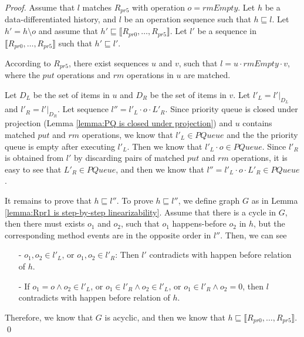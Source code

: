 \documentclass{llncs}
\begin{document}
\begin {proof}

Assume that $l$ matches $R_{\textit{pr5}}$ with operation $o=\textit{rmEmpty}$. Let $h$ be a data-differentiated history, and $l$ be an operation sequence such that $h \sqsubseteq l$. Let $h'=h \setminus o$ and assume that $h' \sqsubseteq \llbracket R_{\textit{pr0}},\ldots,R_{\textit{pr5}} \rrbracket$. Let $l'$ be a sequence in $\llbracket R_{\textit{pr0}},\ldots,R_{\textit{pr5}} \rrbracket$ such that $h' \sqsubseteq l'$.




According to $R_{\textit{pr5}}$, there exist sequences $u$ and $v$, such that $l=u \cdot \textit{rmEmpty} \cdot v$, where the $\textit{put}$ operations and $\textit{rm}$ operations in $u$ are matched.

Let $D_L$ be the set of items in $u$ and $D_R$ be the set of items in $v$. Let $l'_L = l' \vert_{D_L}$ and $l'_R = l' \vert_{D_R}$. Let sequence $l'' = l'_L \cdot o \cdot L'_R$. Since priority queue is closed under projection (Lemma \ref{lemma:PQ is closed under projection}) and $u$ contains matched $\textit{put}$ and $\textit{rm}$ operations, we know that $l'_L \in \textit{PQueue}$ and the the priority queue is empty after executing $l'_L$. Then we know that $l'_L \cdot o \in \textit{PQueue}$. Since $l'_R$ is obtained from $l'$ by discarding pairs of matched $\textit{put}$ and $\textit{rm}$ operations, it is easy to see that $L'_R \in \textit{PQueue}$, and then we know that $l'' = l'_L \cdot o \cdot L'_R \in \textit{PQueue}$.

It remains to prove that $h \sqsubseteq l''$. To prove $h \sqsubseteq l''$, we define graph $G$ as in Lemma \ref{lemma:Rpr1 is step-by-step linearizability}. Assume that there is a cycle in $G$, then there must exists $o_1$ and $o_2$, such that $o_1$ happens-before $o_2$ in $h$, but the corresponding method events are in the opposite order in $l''$. Then, we can see

\begin{itemize}
\setlength{\itemsep}{0.5pt}
\item[-] $o_1,o_2 \in l'_L$, or $o_1,o_2 \in l'_R$: Then $l'$ contradicts with happen before relation of $h$.

\item[-] If $o_1=o \wedge o_2 \in l'_L$, or $o_1 \in l'_R \wedge o_2 \in l'_L$, or $o_1 \in l'_R \wedge o_2 = 0$, then $l$ contradicts with happen before relation of $h$.
\end{itemize}

Therefore, we know that $G$ is acyclic, and then we know that $h \sqsubseteq \llbracket R_{\textit{pr0}},\ldots,R_{\textit{pr5}} \rrbracket$. \qed
\end {proof}
\end{document}

